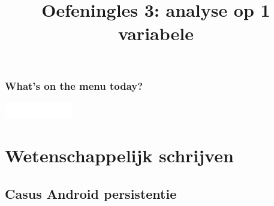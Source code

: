 \documentclass{beamer}
\title[Onderzoekstechnieken]{Oefeningles 3: analyse op 1 variabele}
\author{}
\date{ }
\begin{document}

\HoGentLogo

\begin{frame}[plain]
  \titlepage
\end{frame}




\begin{frame}
  \frametitle{What's on the menu today?}
	\tableofcontents

  \includegraphics[width=3cm]{img/HG-woordmerk-inv}
\end{frame}
\section{Wetenschappelijk schrijven}
\subsection{Casus Android persistentie}
\end{document}

